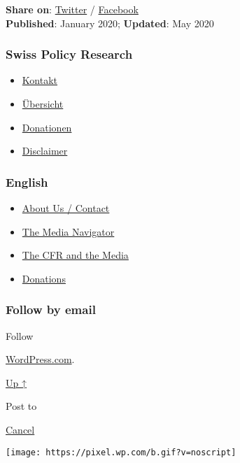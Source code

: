 \textbf{Share on}:
\href{https://twitter.com/intent/tweet?url=https://swprs.org/media-navigator/}{Twitter}
/
\href{https://www.facebook.com/share.php?u=https://swprs.org/media-navigator/}{Facebook}\\
\textbf{Published}: January 2020; \textbf{Updated}: May 2020

\hypertarget{swiss-policy-research}{%
\subsubsection{Swiss Policy Research}\label{swiss-policy-research}}

\begin{itemize}
\tightlist
\item
  \href{https://swprs.org/kontakt/}{Kontakt}
\item
  \href{https://swprs.org/uebersicht/}{Übersicht}
\item
  \href{https://swprs.org/donationen/}{Donationen}
\item
  \href{https://swprs.org/disclaimer/}{Disclaimer}
\end{itemize}

\hypertarget{english}{%
\subsubsection{English}\label{english}}

\begin{itemize}
\tightlist
\item
  \href{https://swprs.org/contact/}{About Us / Contact}
\item
  \href{https://swprs.org/media-navigator/}{The Media Navigator}
\item
  \href{https://swprs.org/the-american-empire-and-its-media/}{The CFR
  and the Media}
\item
  \href{https://swprs.org/donations/}{Donations}
\end{itemize}

\hypertarget{follow-by-email}{%
\subsubsection{Follow by email}\label{follow-by-email}}

Follow

\href{https://wordpress.com/?ref=footer_custom_com}{WordPress.com}.

\protect\hyperlink{}{Up ↑}

Post to

\protect\hyperlink{}{Cancel}

\texttt{[image: https://pixel.wp.com/b.gif?v=noscript]}
